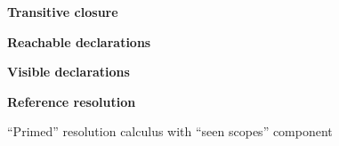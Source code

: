\begin{figure}[t]
\begin{boxedminipage}{\hsize}
\textbf{Transitive closure}
       
\vspace*{-0.5\baselineskip}


\medskip


\smallskip

\textbf{Reachable declarations}
\medskip


\medskip

\textbf{Visible declarations}
\medskip


\medskip

\textbf{Reference resolution}

\medskip 


\medskip

\end{boxedminipage}
\vspace*{-\baselineskip}
\caption{``Primed'' resolution calculus with ``seen scopes'' component}\medskip
\label{fig:seencalc}
\end{figure}

